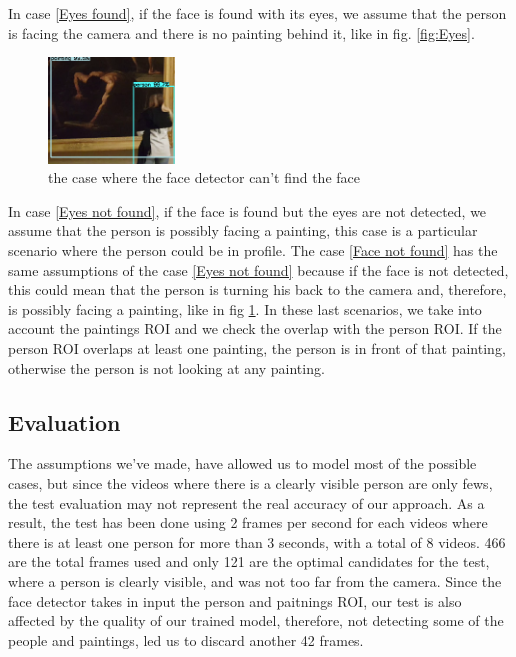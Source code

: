 In case \ref*{Eyes found}, if the face is found with its eyes, we assume that the person is facing the camera and there is no painting behind it, like in fig. \ref{fig:Eyes}.
\begin{figure}[h!]
    \centering
        \includegraphics[width=0.3\textwidth]{pictures/face_detection/face_det1}
    \caption{the case where the face detector can't find the face}
    \label{fig:No_eyes}
\end{figure}
In case \ref*{Eyes not found}, if the face is found but the eyes are not detected, we assume that the person is possibly facing a painting, this case is a particular scenario where the person could be in profile. The case \ref*{Face not found} has the same assumptions of the case \ref*{Eyes not found} because if the face is not detected, this could mean that the person is turning his back to the camera and, therefore, is possibly facing a painting, like in fig \ref{fig:No_eyes}. In these last scenarios, we take into account the paintings ROI and we check the overlap with the person ROI. If the person ROI overlaps at least one painting, the person is in front of that painting, otherwise the person is not looking at any painting.

\subsection{Evaluation}
The assumptions we've made, have allowed us to model most of the possible cases, but since the videos where there is a clearly visible person are only fews, the test evaluation may not represent the real accuracy of our approach. As a result, the test has been done using 2 frames per second for each videos where there is at least one person for more than 3 seconds, with a total of 8 videos. 466 are the total frames used and only 121 are the optimal candidates for the test, where a person is clearly visible, and was not too far from the camera. Since the face detector takes in input the person and paitnings ROI, our test is also affected by the quality of our trained model, therefore, not detecting some of the people and paintings, led us to discard another 42 frames.

